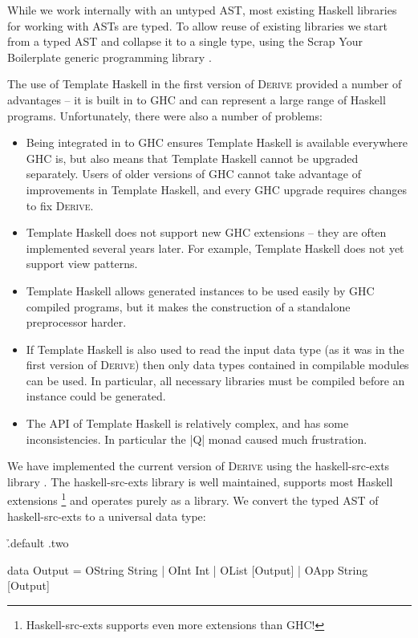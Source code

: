 \documentclass[preprint,draft]{sigplanconf}
\newcommand{\derive}{\textsc{Derive}}
\begin{document}
While we work internally with an untyped AST, most existing Haskell libraries for working with ASTs are typed. To allow reuse of existing libraries we start from a typed AST and collapse it to a single type, using the Scrap Your Boilerplate generic programming library \cite{lammel:syb,lammel:syb2}.

The use of Template Haskell in the first version of \derive{} provided a number of advantages -- it is built in to GHC and can represent a large range of Haskell programs. Unfortunately, there were also a number of problems:

\begin{itemize}
\item Being integrated in to GHC ensures Template Haskell is available everywhere GHC is, but also means that Template Haskell cannot be upgraded separately. Users of older versions of GHC cannot take advantage of improvements in Template Haskell, and every GHC upgrade requires changes to fix \derive{}.
\item Template Haskell does not support new GHC extensions -- they are often implemented several years later. For example, Template Haskell does not yet support view patterns.
\item Template Haskell allows generated instances to be used easily by GHC compiled programs, but it makes the construction of a standalone preprocessor harder.
\item If Template Haskell is also used to read the input data type (as it was in the first version of \derive{}) then only data types contained in compilable modules can be used. In particular, all necessary libraries must be compiled before an instance could be generated.
\item The API of Template Haskell is relatively complex, and has some inconsistencies. In particular the |Q| monad caused much frustration.
\end{itemize}

We have implemented the current version of \derive{} using the haskell-src-exts library \cite{haskell_src_exts}. The haskell-src-exts library is well maintained, supports most Haskell extensions \footnote{Haskell-src-exts supports even more extensions than GHC!} and operates purely as a library. We convert the typed AST of haskell-src-exts to a universal data type:

\h{.default .two}\begin{code}
data Output  =  OString String
             |  OInt Int
             |  OList [Output]
             |  OApp String [Output]
\end{code}
\end{document}
